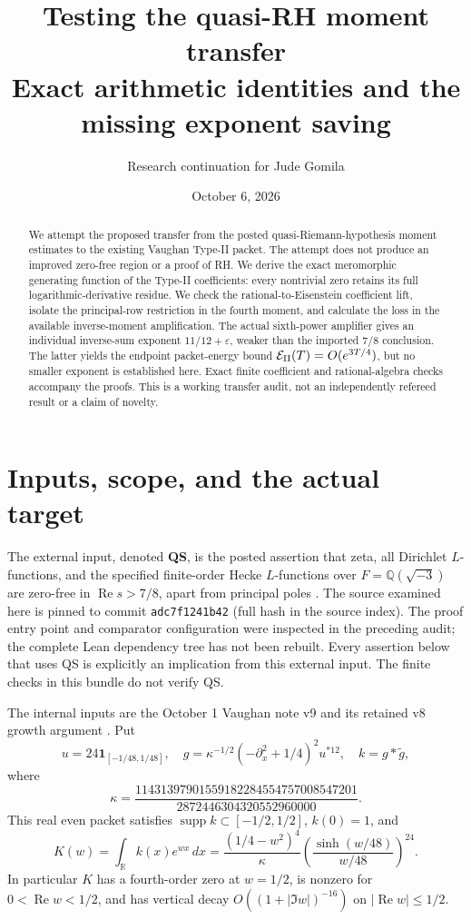 \documentclass[11pt]{article}
\title{Testing the quasi-RH moment transfer\\[4pt]
\large Exact arithmetic identities and the missing exponent saving}
\author{Research continuation for Jude Gomila}
\date{October 6, 2026}
\newcommand{\dd}{\,d}
\newcommand{\Ree}{\operatorname{Re}}
\newcommand{\E}{\mathcal E}
\newcommand{\Q}{\mathbb Q}
\begin{document}
\maketitle
\begin{abstract}
We attempt the proposed transfer from the posted quasi-Riemann-hypothesis
moment estimates to the existing Vaughan Type-II packet. The attempt does
not produce an improved zero-free region or a proof of RH. We derive the
exact meromorphic generating function of the Type-II coefficients: every
nontrivial zero retains its full logarithmic-derivative residue. We check
the rational-to-Eisenstein coefficient lift, isolate the principal-row
restriction in the fourth moment, and calculate the loss in the available
inverse-moment amplification. The actual sixth-power amplifier gives an
individual inverse-sum exponent $11/12+\varepsilon$, weaker than the imported
$7/8$ conclusion. The latter yields the endpoint packet-energy bound
$\E_{\rm II}(T)=O(e^{3T/4})$, but no smaller exponent is established here.
Exact finite coefficient and rational-algebra checks accompany the proofs.
This is a working transfer audit, not an independently refereed result or
a claim of novelty.
\end{abstract}

\section{Inputs, scope, and the actual target}
The external input, denoted \textbf{QS}, is the posted assertion that zeta,
all Dirichlet $L$-functions, and the specified finite-order Hecke
$L$-functions over $F=\Q(\sqrt{-3})$ are zero-free in $\Ree s>7/8$,
apart from principal poles \cite{openai}. The source examined here is pinned
to commit \texttt{adc7f1241b42} (full hash in the source index).
The proof entry point and comparator configuration were inspected in the
preceding audit; the complete Lean dependency tree has not been rebuilt.
Every assertion below that uses QS is explicitly an implication from this
external input. The finite checks in this bundle do not verify QS.

The internal inputs are the October 1 Vaughan note v9 and its retained
v8 growth argument \cite{v9,v8}. Put
\[
 u=24\mathbf1_{[-1/48,1/48]},\quad
 g=\kappa^{-1/2}(-\partial_x^2+1/4)^2u^{*12},\quad
 k=g*\widetilde g,
\]
where
\[
 \kappa=\frac{11431397901559182284554757008547201}
 {2872446304320552960000}.
\]
This real even packet satisfies $\operatorname{supp}k\subset[-1/2,1/2]$,
$k(0)=1$, and
\begin{equation}\label{eq:K}
 K(w)=\int_{\mathbb R}k(x)e^{wx}\dd x
 =\frac{(1/4-w^2)^4}{\kappa}
 \left(\frac{\sinh(w/48)}{w/48}\right)^{24}.
\end{equation}
In particular $K$ has a fourth-order zero at $w=1/2$, is nonzero for
$0<\Ree w<1/2$, and has vertical decay $O((1+|\Im w|)^{-16})$ on
$|\Ree w|\le1/2$.
\end{document}

